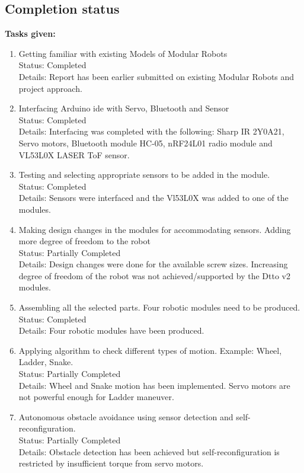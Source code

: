 \documentclass[a4paper,12pt,oneside]{book}
\begin{document}
\subsection*{Completion status}
\textbf{Tasks given: }
\begin{enumerate}
\item Getting familiar with existing Models of Modular Robots\\ Status: Completed
\\ Details: Report has been earlier submitted on existing Modular Robots and project approach.

\item Interfacing Arduino ide with Servo, Bluetooth and Sensor 
\\ Status: Completed
\\ Details: Interfacing was completed with the following: Sharp IR 2Y0A21, Servo motors, Bluetooth module HC-05, nRF24L01 radio module and VL53L0X LASER ToF sensor.

\item Testing and selecting appropriate sensors to be added in the module.
\\ Status: Completed
\\ Details: Sensors were interfaced and the Vl53L0X was added to one of the modules.

\pagebreak

\item Making design changes in the modules for accommodating sensors. Adding more degree of freedom to the robot
\\ Status: Partially Completed
\\ Details: Design changes were done for the available screw sizes. Increasing degree of freedom of the robot was not achieved/supported by the Dtto v2 modules.

\item Assembling all the selected parts. Four robotic modules need to be produced.
\\ Status: Completed
\\ Details: Four robotic modules have been produced.

\item Applying algorithm to check different types of motion. Example: Wheel, Ladder, Snake.
\\ Status: Partially Completed
\\ Details: Wheel and Snake motion has been implemented. Servo motors are not powerful enough for Ladder maneuver.

\item Autonomous obstacle avoidance using sensor detection and self- reconfiguration.
\\ Status: Partially Completed
\\ Details: Obstacle detection has been achieved but self-reconfiguration is restricted by insufficient torque from servo motors.


\end{enumerate}
\end{document}
